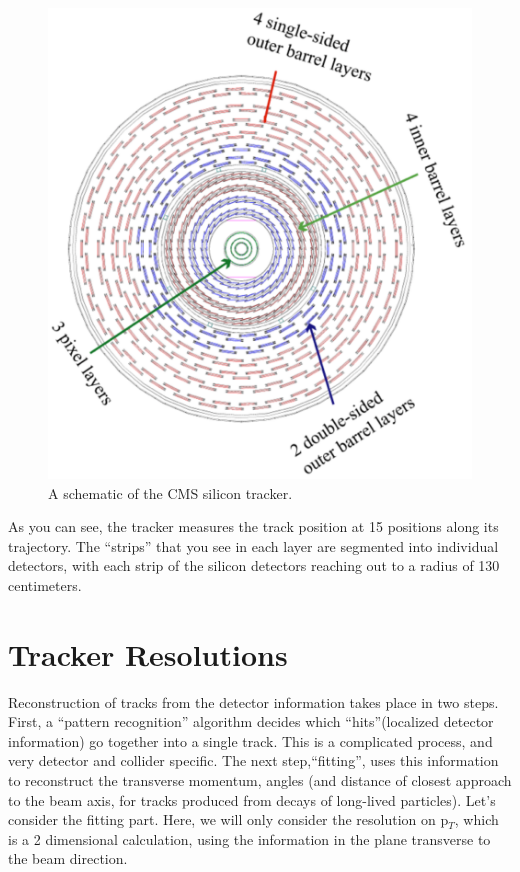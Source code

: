 \begin{figure}[h]
\centering\includegraphics[scale=0.5]{./Trackers/Pictures/fig3.pdf}
\caption{ A schematic of the CMS silicon tracker.}
\label{fig:trk3}
\end{figure}
\noindent
As you can see, the tracker measures the track position at 15 positions along its trajectory. The ``strips'' that you see in each layer are segmented into individual detectors, with each strip of the silicon detectors reaching out to a radius of 130 centimeters. 
\section{Tracker Resolutions}
Reconstruction of tracks from the detector information takes place in two steps. First, a ``pattern recognition'' algorithm decides which ``hits''(localized detector information) go together into a single track. This is a complicated process, and very detector and collider specific. The next step,``fitting'', uses this information to reconstruct the transverse momentum, angles (and distance of closest approach to the beam axis, for tracks produced from decays of long-lived particles).  
Let's consider the fitting part.  Here, we will only consider the resolution on p$_{T}$, which is a 2 dimensional calculation, using the information in the plane transverse to the beam direction.   

